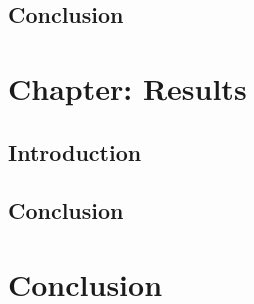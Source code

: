 \documentclass[12pt, a4paper]{article}
\newcommand{\redtext}[1]{\textcolor{red}{#1}}
\begin{document}
\subsection*{Conclusion}


\section*{Chapter: Results}

\subsection*{Introduction}

\subsection*{Conclusion}

\newpage
\section*{Conclusion}

\end{document}
